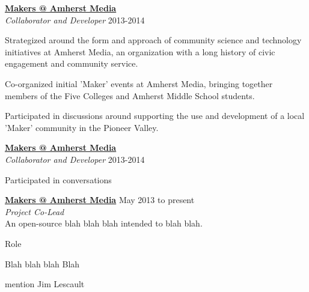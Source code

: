 \documentclass[10pt]{article}
\newcommand{\blankline}{\quad\pagebreak[3]}
\newcommand{\halfblankline}{\quad\vspace{-0.5\baselineskip}\pagebreak[3]}
\begin{document}
\halfblankline

\begin{innerlist}
\item   
\item 
\end{innerlist}  

\blankline

\href{LINK}{\textbf{Makers @ Amherst Media}}\\
\emph{Collaborator and Developer} \hfill {2013-2014}

\halfblankline

\begin{innerlist}
\item Strategized around the form and approach of community science and technology initiatives at Amherst Media, an organization with a long history of civic engagement and community service. 
\item Co-organized initial 'Maker' events at Amherst Media, bringing together members of the Five Colleges and Amherst Middle School students.
\item Participated in discussions around supporting the use and development of a local 'Maker' community in the Pioneer Valley.
\end{innerlist}  

\blankline

\href{http://www.umass.edu/digitalcenter/}{\textbf{Makers @ Amherst Media}}\\
\emph{Collaborator and Developer} \hfill {2013-2014}

\halfblankline

\begin{innerlist}
\item Participated in conversations 
\end{innerlist}  

\blankline


\href{http://open-eie.io}{\textbf{Makers @ Amherst Media}} \hfill {May 2013 to present} \\
\emph{Project Co-Lead} \\
An open-source blah blah blah intended to blah blah.
    \begin{innerlist}
        \item Role
        \item Blah blah blah Blah 
        \item mention Jim Lescault
\end{innerlist}
\end{document}
